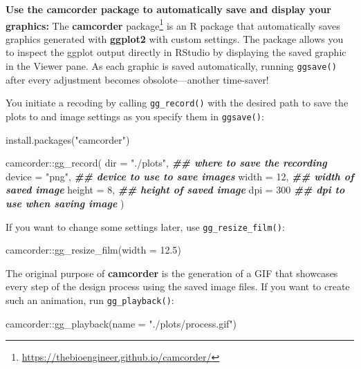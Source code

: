 \documentclass[
]{krantz}
\makeatletter
\newenvironment{Shaded}{\begin{snugshade}}{\end{snugshade}}
\newcommand{\AttributeTok}[1]{\textcolor[rgb]{0.61,0.61,0.61}{#1}}
\newcommand{\DecValTok}[1]{\textcolor[rgb]{0.06,0.06,0.06}{#1}}
\newcommand{\DocumentationTok}[1]{\textcolor[rgb]{0.37,0.37,0.37}{\textbf{\textit{#1}}}}
\newcommand{\FloatTok}[1]{\textcolor[rgb]{0.06,0.06,0.06}{#1}}
\newcommand{\FunctionTok}[1]{\textcolor[rgb]{0,0,0}{#1}}
\newcommand{\NormalTok}[1]{#1}
\newcommand{\SpecialCharTok}[1]{\textcolor[rgb]{0,0,0}{#1}}
\newcommand{\StringTok}[1]{\textcolor[rgb]{0.5,0.5,0.5}{#1}}
\renewcommand{\href}[2]{#2\footnote{\url{#1}}}
\newenvironment{kframe}{%
\medskip{}
\setlength{\fboxsep}{.8em}
 \def\at@end@of@kframe{}%
 \ifinner\ifhmode%
  \def\at@end@of@kframe{\end{minipage}}%
  \begin{minipage}{\columnwidth}%
 \fi\fi%
 \def\FrameCommand##1{\hskip\@totalleftmargin \hskip-\fboxsep
 \colorbox{shadecolor}{##1}\hskip-\fboxsep
     \hskip-\linewidth \hskip-\@totalleftmargin \hskip\columnwidth}%
 \MakeFramed {\advance\hsize-\width
   \@totalleftmargin\z@ \linewidth\hsize
   \@setminipage}}%
 {\par\unskip\endMakeFramed%
 \at@end@of@kframe}
\renewenvironment{Shaded}{\begin{kframe}}{\end{kframe}}
\makeatother
\begin{document}
\textbf{Use the camcorder package to automatically save and display your graphics:} The \href{https://thebioengineer.github.io/camcorder/}{\textbf{camcorder} package} \citep{camcorder} is an R package that automatically saves graphics generated with \textbf{ggplot2} with custom settings. The package allows you to inspect the ggplot output directly in RStudio by displaying the saved graphic in the Viewer pane. As each graphic is saved automatically, running \texttt{ggsave()} after every adjustment becomes obsolote---another time-saver!

You initiate a recoding by calling \texttt{gg\_record()} with the desired path to save the plots to and image settings as you specify them in \texttt{ggsave()}:

\begin{Shaded}
\begin{Highlighting}[]
\FunctionTok{install.packages}\NormalTok{(}\StringTok{"camcorder"}\NormalTok{)}

\NormalTok{camcorder}\SpecialCharTok{::}\FunctionTok{gg\_record}\NormalTok{(}
  \AttributeTok{dir =} \StringTok{"./plots"}\NormalTok{, }\DocumentationTok{\#\# where to save the recording}
  \AttributeTok{device =} \StringTok{"png"}\NormalTok{,  }\DocumentationTok{\#\# device to use to save images}
  \AttributeTok{width =} \DecValTok{12}\NormalTok{,      }\DocumentationTok{\#\# width of saved image}
  \AttributeTok{height =} \DecValTok{8}\NormalTok{,      }\DocumentationTok{\#\# height of saved image}
  \AttributeTok{dpi =} \DecValTok{300}        \DocumentationTok{\#\# dpi to use when saving image}
\NormalTok{)}
\end{Highlighting}
\end{Shaded}

If you want to change some settings later, use \texttt{gg\_resize\_film()}:

\begin{Shaded}
\begin{Highlighting}[]
\NormalTok{camcorder}\SpecialCharTok{::}\FunctionTok{gg\_resize\_film}\NormalTok{(}\AttributeTok{width =} \FloatTok{12.5}\NormalTok{)}
\end{Highlighting}
\end{Shaded}

The original purpose of \textbf{camcorder} is the generation of a GIF that showcases every step of the design process using the saved image files. If you want to create such an animation, run \texttt{gg\_playback()}:

\begin{Shaded}
\begin{Highlighting}[]
\NormalTok{camcorder}\SpecialCharTok{::}\FunctionTok{gg\_playback}\NormalTok{(}\AttributeTok{name =} \StringTok{"./plots/process.gif"}\NormalTok{)}
\end{Highlighting}
\end{Shaded}
\end{document}
